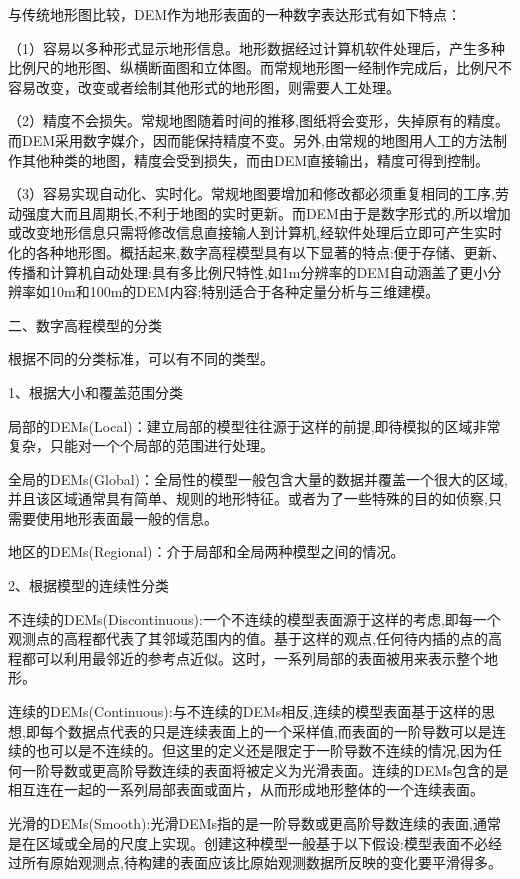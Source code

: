 与传统地形图比较，DEM作为地形表面的一种数字表达形式有如下特点：

（1）容易以多种形式显示地形信息。地形数据经过计算机软件处理后，产生多种比例尺的地形图、纵横断面图和立体图。而常规地形图一经制作完成后，比例尺不容易改变，改变或者绘制其他形式的地形图，则需要人工处理。

（2）精度不会损失。常规地图随着时间的推移,图纸将会变形，失掉原有的精度。而DEM采用数字媒介，因而能保持精度不变。另外,由常规的地图用人工的方法制作其他种类的地图，精度会受到损失，而由DEM直接输出，精度可得到控制。

（3）容易实现自动化、实时化。常规地图要增加和修改都必须重复相同的工序,劳动强度大而且周期长,不利于地图的实时更新。而DEM由于是数字形式的,所以增加或改变地形信息只需将修改信息直接输人到计算机,经软件处理后立即可产生实时化的各种地形图。概括起来,数字高程模型具有以下显著的特点:便于存储、更新、传播和计算机自动处理:具有多比例尺特性,如1m分辨率的DEM自动涵盖了更小分辨率如10m和100m的DEM内容;特别适合于各种定量分析与三维建模。

二、数字高程模型的分类

根据不同的分类标准，可以有不同的类型。

1、根据大小和覆盖范围分类

局部的DEMs(Local)：建立局部的模型往往源于这样的前提,即待模拟的区域非常复杂，只能对一个个局部的范围进行处理。

全局的DEMs(Global)：全局性的模型一般包含大量的数据并覆盖一个很大的区域,并且该区域通常具有简单、规则的地形特征。或者为了一些特殊的目的如侦察,只需要使用地形表面最一般的信息。

地区的DEMs(Regional)：介于局部和全局两种模型之间的情况。

2、根据模型的连续性分类

不连续的DEMs(Discontinuous):一个不连续的模型表面源于这样的考虑,即每一个观测点的高程都代表了其邻域范围内的值。基于这样的观点,任何待内插的点的高程都可以利用最邻近的参考点近似。这时，一系列局部的表面被用来表示整个地形。

连续的DEMs(Continuous):与不连续的DEMs相反,连续的模型表面基于这样的思想,即每个数据点代表的只是连续表面上的一个采样值,而表面的一阶导数可以是连续的也可以是不连续的。但这里的定义还是限定于一阶导数不连续的情况,因为任何一阶导数或更高阶导数连续的表面将被定义为光滑表面。连续的DEMs包含的是相互连在一起的一系列局部表面或面片，从而形成地形整体的一个连续表面。

光滑的DEMs(Smooth):光滑DEMs指的是一阶导数或更高阶导数连续的表面,通常是在区域或全局的尺度上实现。创建这种模型一般基于以下假设:模型表面不必经过所有原始观测点,待构建的表面应该比原始观测数据所反映的变化要平滑得多。

